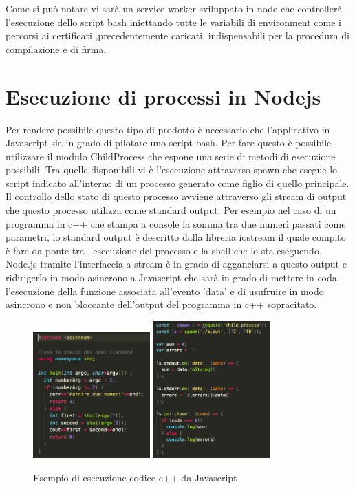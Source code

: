 Come si può notare vi sarà un service worker sviluppato in node che controllerà l’esecuzione dello script bash iniettando tutte le variabili di environment come i percorsi ai certificati ,precedentemente caricati, indispensabili per la procedura di compilazione e di firma.\vspace{5mm}

\section{Esecuzione di processi in Nodejs}
\vspace{5mm}Per rendere possibile questo tipo di prodotto è necessario che l'applicativo in Javascript sia in grado di pilotare uno script bash. Per fare questo è possibile utilizzare il modulo ChildProcess\cite{ChildProcess} che espone una serie di metodi di esecuzione possibili. Tra quelle disponibili vi è l'esecuzione attraverso spawn che esegue lo script indicato all'interno di un processo generato come figlio di quello principale. Il controllo dello stato di questo processo avviene attraverso gli stream di output che questo processo utilizza come standard output. Per esempio nel caso di un programma in c++ che stampa a console la somma tra due numeri passati come parametri, lo standard output è descritto dalla libreria iostream il quale compito è fare da ponte tra l'esecuzione del processo e la shell che lo sta eseguendo. Node.js tramite l'interfaccia a stream è in grado di agganciarsi a questo output e ridirigerlo in modo asincrono a Javascript che sarà in grado di mettere in coda l'esecuzione della funzione associata all'evento 'data' e di usufruire in modo asincrono e non bloccante dell'output del programma in c++ sopracitato.

\begin{figure}[h]
\centering
\includegraphics[width=0.4\textwidth]{images/cppCode.png}
\includegraphics[width=0.4\textwidth]{images/jsCode.png}
\caption{Esempio di esecuzione codice c++ da Javascript}
\end{figure}

